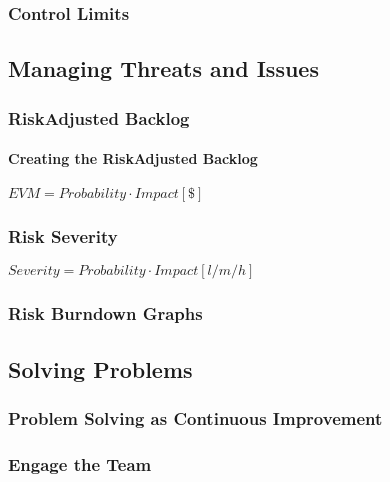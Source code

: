 \documentclass[letterpaper,10pt,english]{jupyterBook}
\begin{document}
\subsubsection{Control Limits}
\label{\detokenize{APM/agile:control-limits}}

\subsection{Managing Threats and Issues}
\label{\detokenize{APM/agile:managing-threats-and-issues}}

\subsubsection{Risk\sphinxhyphen{}Adjusted Backlog}
\label{\detokenize{APM/agile:risk-adjusted-backlog}}

\paragraph{Creating the Risk\sphinxhyphen{}Adjusted Backlog}
\label{\detokenize{APM/agile:creating-the-risk-adjusted-backlog}}
\sphinxAtStartPar
\(EVM = Probability \cdot Impact [\$]\)


\subsubsection{Risk Severity}
\label{\detokenize{APM/agile:risk-severity}}
\sphinxAtStartPar
\(Severity=Probability \cdot Impact [l/m/h]\)


\subsubsection{Risk Burndown Graphs}
\label{\detokenize{APM/agile:risk-burndown-graphs}}

\subsection{Solving Problems}
\label{\detokenize{APM/agile:solving-problems}}

\subsubsection{Problem Solving as Continuous Improvement}
\label{\detokenize{APM/agile:problem-solving-as-continuous-improvement}}

\subsubsection{Engage the Team}
\label{\detokenize{APM/agile:engage-the-team}}
\end{document}
